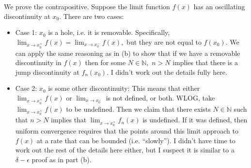 \documentclass{article}
\numberwithin{equation}{section}
\begin{document}
\begin{enumerate}
\begin{enumerate}[label=(\alph*)]
        We prove the contrapositive. Suppose the limit function $f(x)$ has an oscillating discontinuity at $x_0.$ There are two cases:
        \begin{itemize}
            \item Case 1: $x_0$ is a hole, i.e. it is removable. Specifically, $\lim_{x\to x_0^+}f(x) = \lim_{x\to x_0^-}f(x),$ but they are not equal to $f(x_0).$ We can apply the same reasoning as in (b) to show that if we have a removable discontinuity in $f(x)$ then for some $N\in \mathbb{N},$ $n>N$ implies that there is a jump discontinuity at $f_n(x_0).$ I didn't work out the details fully here.
            \item Case 2: $x_0$ is some other discontinuity: This means that either $\lim_{x\to x_0^+}f(x)$ or $\lim_{x\to x_0^-}$ is not defined, or both. WLOG, take $\lim_{x\to x_0^+}f(x)$ to be undefined. Then we claim that there exists $N\in \mathbb{N}$ such that $n>N$ implies that $\lim_{x\to x_0^+}f_n(x)$ is undefined. If it was defined, then uniform convergence requires that the points around this limit approach to $f(x)$ at a rate that can be bounded (i.e. ``slowly''). I didn't have time to work out the rest of the details here either, but I suspect it is similar to a $\delta-\epsilon$ proof as in part (b).
        \end{itemize}
    \end{enumerate}

\end{enumerate}
\end{document}
